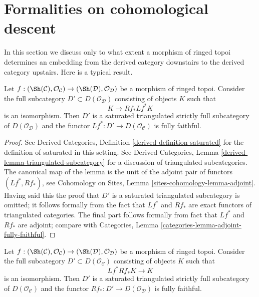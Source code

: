\section{Formalities on cohomological descent}
\label{section-formal-cohomological-descent}

\noindent
In this section we discuss only to what extent a morphism
of ringed topoi determines an embedding from the derived
category downstairs to the derived category upstairs.
Here is a typical result.

\begin{lemma}
\label{lemma-downstairs}
Let $f : (\Sh(\mathcal{C}), \mathcal{O}_\mathcal{C}) \to
(\Sh(\mathcal{D}), \mathcal{O}_\mathcal{D})$ be a morphism of ringed topoi.
Consider the full subcategory $D' \subset D(\mathcal{O}_\mathcal{D})$
consisting of objects $K$ such that
$$
K \longrightarrow Rf_*Lf^*K
$$
is an isomorphism. Then $D'$ is a saturated triangulated strictly full
subcategory of $D(\mathcal{O}_\mathcal{D})$ and the functor
$Lf^* : D' \to D(\mathcal{O}_\mathcal{C})$ is fully faithful.
\end{lemma}

\begin{proof}
See Derived Categories, Definition \ref{derived-definition-saturated}
for the definition of saturated in this setting. See
Derived Categories, Lemma \ref{derived-lemma-triangulated-subcategory}
for a discussion of triangulated subcategories.
The canonical map of the lemma is the unit of the adjoint
pair of functors $(Lf^*, Rf_*)$, see
Cohomology on Sites, Lemma \ref{sites-cohomology-lemma-adjoint}.
Having said this the proof that $D'$ is a saturated triangulated subcategory
is omitted; it follows formally from the fact that
$Lf^*$ and $Rf_*$ are exact functors of triangulated categories.
The final part follows formally from
fact that $Lf^*$ and $Rf_*$ are adjoint; compare with
Categories, Lemma \ref{categories-lemma-adjoint-fully-faithful}.
\end{proof}

\begin{lemma}
\label{lemma-upstairs}
Let $f : (\Sh(\mathcal{C}), \mathcal{O}_\mathcal{C}) \to
(\Sh(\mathcal{D}), \mathcal{O}_\mathcal{D})$ be a morphism of ringed topoi.
Consider the full subcategory $D' \subset D(\mathcal{O}_\mathcal{C})$
consisting of objects $K$ such that
$$
Lf^*Rf_*K \longrightarrow K
$$
is an isomorphism. Then $D'$ is a saturated triangulated strictly full
subcategory of $D(\mathcal{O}_\mathcal{C})$ and the functor
$Rf_* : D' \to D(\mathcal{O}_\mathcal{D})$ is fully faithful.
\end{lemma}

